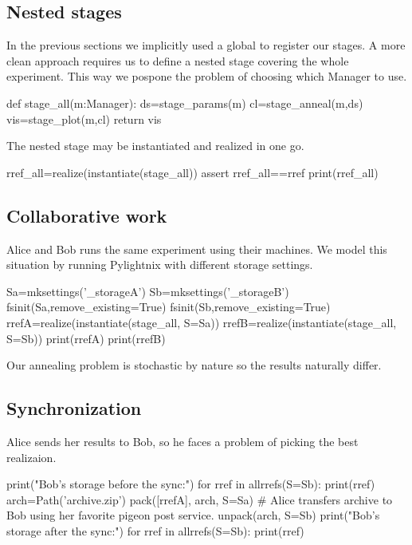 \mystdout

\subsection{Nested stages}

In the previous sections we implicitly used a global
 to register our stages. A more clean
approach requires us to define a nested stage covering the whole experiment.
This way we pospone the problem of choosing which Manager to use.

\begin{pythontexcode}
def stage_all(m:Manager):
  ds=stage_params(m)
  cl=stage_anneal(m,ds)
  vis=stage_plot(m,cl)
  return vis
\end{pythontexcode}

The nested stage may be instantiated and realized in one go.

\begin{pythontexcode}
rref_all=realize(instantiate(stage_all))
assert rref_all==rref
print(rref_all)
\end{pythontexcode}

\mystdout


\subsection{Collaborative work}

Alice and Bob runs the same experiment using their machines. We model
this situation by running Pylightnix with different storage settings.

\begin{pythontexcode}
Sa=mksettings('_storageA')
Sb=mksettings('_storageB')
fsinit(Sa,remove_existing=True)
fsinit(Sb,remove_existing=True)
rrefA=realize(instantiate(stage_all, S=Sa))
rrefB=realize(instantiate(stage_all, S=Sb))
print(rrefA)
print(rrefB)
\end{pythontexcode}

Our annealing problem is stochastic by nature so the results naturally differ.

\subsection{Synchronization}

Alice sends her results to Bob, so he faces a problem of picking the best
realizaion.

\begin{pythontexcode}
print("Bob's storage before the sync:")
for rref in allrrefs(S=Sb):
  print(rref)
arch=Path('archive.zip')
pack([rrefA], arch, S=Sa)
# Alice transfers archive to Bob using her favorite pigeon post service.
unpack(arch, S=Sb)
print("Bob's storage after the sync:")
for rref in allrrefs(S=Sb):
  print(rref)
\end{pythontexcode}

